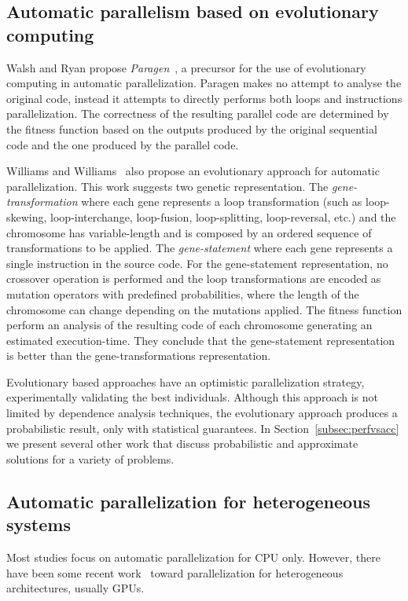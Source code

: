 \documentclass[a4paper,12pt]{article}
\begin{document}
\subsection{Automatic parallelism based on evolutionary computing}

Walsh and Ryan propose {\em Paragen}~\cite{walsh95,walsh96}, a precursor for
the use of evolutionary computing in automatic parallelization.  Paragen makes
no attempt to analyse the original code, instead it attempts to directly
performs both loops and instructions parallelization. The correctness of the
resulting parallel code are determined by the fitness function based on the
outputs produced by the original sequential code and the one produced by the
parallel code.

Williams and Williams~\cite{williams96,williams99} also propose an evolutionary
approach for automatic parallelization.  This work suggests two genetic
representation.  The {\em gene-transformation} where each gene represents a
loop transformation (such as loop-skewing, loop-interchange, loop-fusion,
loop-splitting, loop-reversal, etc.) and the chromosome has variable-length and
is composed by an ordered sequence of transformations to be applied.  The {\em
gene-statement} where each gene represents a single instruction in the source
code. For the gene-statement representation, no crossover operation is
performed and the loop transformations are encoded as mutation operators with
predefined probabilities, where the length of the chromosome can change
depending on the mutations applied. The fitness function perform an analysis of
the resulting code of each chromosome generating an estimated execution-time.
They conclude that the gene-statement representation is better than the
gene-transformations representation.

Evolutionary based approaches have an optimistic parallelization strategy,
experimentally validating the best individuals. Although this approach is not
limited by dependence analysis techniques, the evolutionary approach produces a
probabilistic result, only with statistical guarantees.  In
Section~\ref{subsec:perfvsacc} we present several other work that discuss
probabilistic and approximate solutions for a variety of problems.

\subsection{Automatic parallelization for heterogeneous systems}

Most studies focus on automatic parallelization for CPU only.  However, there
have been some recent work~\cite{leung09,baskaran10,amini12,govindarajan13}
toward parallelization for heterogeneous architectures, usually GPUs.
\end{document}
